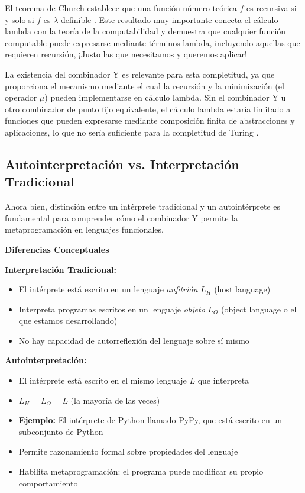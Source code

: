 \documentclass[11pt]{article}
\begin{document}
El teorema de Church establece que una función número-teórica $f$ es recursiva si y solo si $f$ es $\lambda$-definible \cite{church1936}. Este resultado muy importante conecta el cálculo lambda con la teoría de la computabilidad y demuestra que cualquier función computable puede expresarse mediante términos lambda, incluyendo aquellas que requieren recursión, ¡Justo las que necesitamos y queremos aplicar!

La existencia del combinador Y es relevante para esta completitud, ya que proporciona el mecanismo mediante el cual la recursión y la minimización (el operador $\mu$) pueden implementarse en cálculo lambda. Sin el combinador Y u otro combinador de punto fijo equivalente, el cálculo lambda estaría limitado a funciones que pueden expresarse mediante composición finita de abstracciones y aplicaciones, lo que no sería suficiente para la completitud de Turing \cite{barendregt1984}.
















\subsection{Autointerpretación vs. Interpretación Tradicional}

Ahora bien, distinción entre un intérprete tradicional y un autointérprete es fundamental para comprender cómo el combinador Y permite la metaprogramación en lenguajes funcionales.

\textbf{Diferencias Conceptuales}

\textbf{Interpretación Tradicional:}
\begin{itemize}
    \item El intérprete está escrito en un lenguaje \textit{anfitrión} $L_H$ (host language)
    \item Interpreta programas escritos en un lenguaje \textit{objeto} $L_O$ (object language o el que estamos desarrollando)
    \item No hay capacidad de autorreflexión del lenguaje sobre sí mismo
\end{itemize}

\textbf{Autointerpretación:}
\begin{itemize}
    \item El intérprete está escrito en el mismo lenguaje $L$ que interpreta
    \item $L_H = L_O = L$ (la mayor\'ia de las veces)
    \item \textbf{Ejemplo:} El intérprete de Python llamado PyPy, que está escrito en un subconjunto de Python

    \item Permite razonamiento formal sobre propiedades del lenguaje
    \item Habilita metaprogramación: el programa puede modificar su propio comportamiento
\end{itemize}
\end{document}
